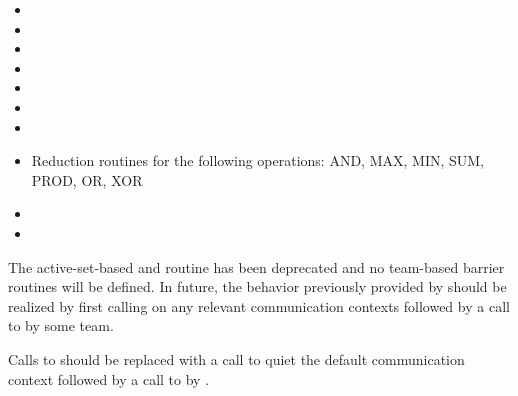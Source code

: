 \begin{DeprecateBlock}
\begin{itemize}
\item {}
\item {}
\item {}
\item {}
\item {}
\item {}
\item {}
\item Reduction routines for the following operations: AND, MAX, MIN, SUM, PROD, OR, XOR
\item {}
\item {}
\end{itemize}

{\color{Green}
The active-set-based  and routine has been deprecated and
no team-based barrier routines will be defined. In future, the behavior
previously provided by  should be realized by first calling
 on any relevant communication contexts followed by a call
to  by some \openshmem team.

Calls to 
should be replaced with a call to quiet the default communication context followed
by a call to  by .
}
\end{DeprecateBlock}
